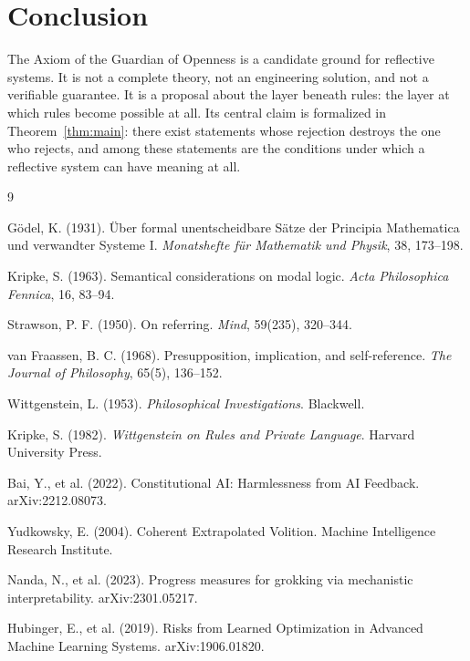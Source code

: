 \documentclass[11pt]{article}
\theoremstyle{remark}
\begin{document}
\section{Conclusion}

The Axiom of the Guardian of Openness is a candidate ground for reflective systems. It is not a complete theory, not an engineering solution, and not a verifiable guarantee. It is a proposal about the layer beneath rules: the layer at which rules become possible at all. Its central claim is formalized in Theorem~\ref{thm:main}: there exist statements whose rejection destroys the one who rejects, and among these statements are the conditions under which a reflective system can have meaning at all.

\begin{thebibliography}{9}

G\"odel, K. (1931). \"Uber formal unentscheidbare S\"atze der Principia Mathematica und verwandter Systeme I. \emph{Monatshefte f\"ur Mathematik und Physik}, 38, 173--198.

Kripke, S. (1963). Semantical considerations on modal logic. \emph{Acta Philosophica Fennica}, 16, 83--94.

Strawson, P. F. (1950). On referring. \emph{Mind}, 59(235), 320--344.

van Fraassen, B. C. (1968). Presupposition, implication, and self-reference. \emph{The Journal of Philosophy}, 65(5), 136--152.

Wittgenstein, L. (1953). \emph{Philosophical Investigations}. Blackwell.

Kripke, S. (1982). \emph{Wittgenstein on Rules and Private Language}. Harvard University Press.

Bai, Y., et al. (2022). Constitutional AI: Harmlessness from AI Feedback. arXiv:2212.08073.

Yudkowsky, E. (2004). Coherent Extrapolated Volition. Machine Intelligence Research Institute.

Nanda, N., et al. (2023). Progress measures for grokking via mechanistic interpretability. arXiv:2301.05217.

Hubinger, E., et al. (2019). Risks from Learned Optimization in Advanced Machine Learning Systems. arXiv:1906.01820.

\end{thebibliography}
\end{document}
